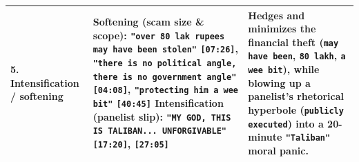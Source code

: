\documentclass[10pt,a4paper]{article}
\begin{document}
\begin{longtable}{@{}>{\raggedright\arraybackslash}p{} >{\raggedright\arraybackslash}p{} >{\raggedright\arraybackslash}p{}@{}}
\addlinespace[4pt]
\textbf{5. Intensification / softening} & \textbf{Softening (scam size \& scope):} \texttt{"over 80 lak rupees may have been stolen"} \texttt{[07:26]}, \texttt{"there is no political angle, there is no government angle"} \texttt{[04:08]}, \texttt{"protecting him a wee bit"} \texttt{[40:45]} \newline  \textbf{Intensification (panelist slip):} \texttt{"MY GOD, THIS IS TALIBAN... UNFORGIVABLE"} \texttt{[17:20]}, \texttt{[27:05]} & Hedges and minimizes the financial theft (\texttt{may have been}, \texttt{80 lakh}, \texttt{a wee bit}), while blowing up a panelist's rhetorical hyperbole (\texttt{publicly executed}) into a 20-minute \texttt{"Taliban"} moral panic. \\
\bottomrule
\end{longtable}
\end{document}
